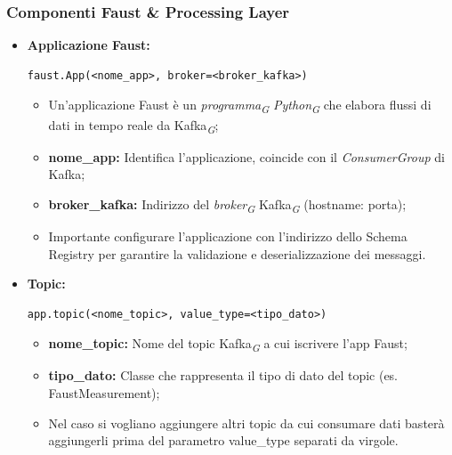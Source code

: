 \subsubsection{Componenti Faust \& Processing Layer}
\begin{itemize}
    \item \textbf{Applicazione Faust:}
    \begin{lstlisting}[style=code]
    faust.App(<nome_app>, broker=<broker_kafka>)
    \end{lstlisting} 
    \begin{itemize}
        \item Un'applicazione Faust è un \textit{programma}\textsubscript{\textit{G}} \textit{Python}\textsubscript{\textit{G}} che elabora flussi di dati in tempo reale da Kafka\textsubscript{\textit{G}};
        \item \textbf{nome\_app:} Identifica l'applicazione, coincide con il \textit{ConsumerGroup} di Kafka;
        \item \textbf{broker\_kafka:} Indirizzo del \textit{broker}\textsubscript{\textit{G}} Kafka\textsubscript{\textit{G}} (hostname: porta);
        \item Importante configurare l'applicazione con l'indirizzo dello Schema Registry per garantire la validazione e deserializzazione dei messaggi.
    \end{itemize}

    \item \textbf{Topic:}
    \begin{lstlisting}[style=code]
    app.topic(<nome_topic>, value_type=<tipo_dato>)
    \end{lstlisting}  
    \begin{itemize}
        \item \textbf{nome\_topic:} Nome del topic Kafka\textsubscript{\textit{G}} a cui iscrivere l'app Faust;
        \item \textbf{tipo\_dato:} Classe che rappresenta il tipo di dato del topic (es. FaustMeasurement);
        \item Nel caso si vogliano aggiungere altri topic da cui consumare dati basterà aggiungerli prima del parametro value\_type separati da virgole.
    \end{itemize}


\end{itemize}

